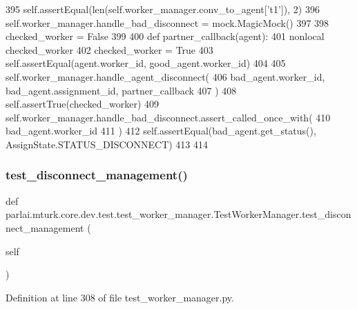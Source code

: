\begin{DoxyCode}
395         self.assertEqual(len(self.worker\_manager.conv\_to\_agent[\textcolor{stringliteral}{'t1'}]), 2)
396         self.worker\_manager.handle\_bad\_disconnect = mock.MagicMock()
397 
398         checked\_worker = \textcolor{keyword}{False}
399 
400         \textcolor{keyword}{def }partner\_callback(agent):
401             nonlocal checked\_worker
402             checked\_worker = \textcolor{keyword}{True}
403             self.assertEqual(agent.worker\_id, good\_agent.worker\_id)
404 
405         self.worker\_manager.handle\_agent\_disconnect(
406             bad\_agent.worker\_id, bad\_agent.assignment\_id, partner\_callback
407         )
408         self.assertTrue(checked\_worker)
409         self.worker\_manager.handle\_bad\_disconnect.assert\_called\_once\_with(
410             bad\_agent.worker\_id
411         )
412         self.assertEqual(bad\_agent.get\_status(), AssignState.STATUS\_DISCONNECT)
413 
414 
\end{DoxyCode}
\mbox{\label{classparlai_1_1mturk_1_1core_1_1dev_1_1test_1_1test__worker__manager_1_1TestWorkerManager_a67df06527d24aa6e0371ebe33d1d9cc5}} 
\subsubsection{\texorpdfstring{test\+\_\+disconnect\+\_\+management()}{test\_disconnect\_management()}}
{\footnotesize\ttfamily def parlai.\+mturk.\+core.\+dev.\+test.\+test\+\_\+worker\+\_\+manager.\+Test\+Worker\+Manager.\+test\+\_\+disconnect\+\_\+management (\begin{DoxyParamCaption}\item[{}]{self }\end{DoxyParamCaption})}



Definition at line 308 of file test\+\_\+worker\+\_\+manager.\+py.


